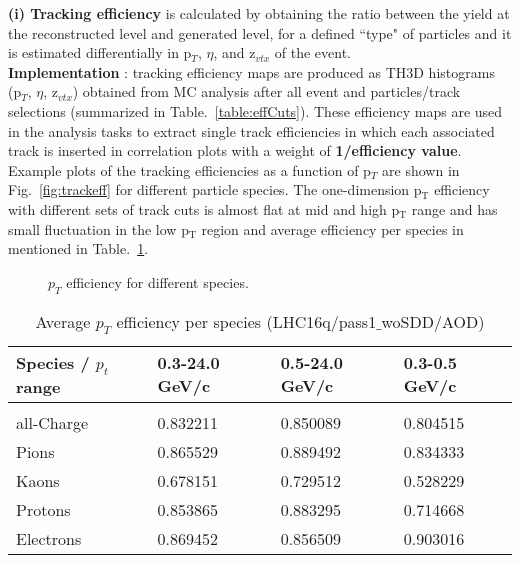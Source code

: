 
{\bf \normalsize (i) Tracking efficiency} is calculated by obtaining the ratio between the yield at the reconstructed level and generated level, for a defined ``type" of particles and it is estimated differentially in p$_T$, $\eta$, and z$_{vtx}$ of the event.\\
{\bf Implementation }: tracking efficiency maps are produced as TH3D histograms (p$_T$, $\eta$, z$_{vtx}$) obtained from MC analysis after all event and particles/track selections (summarized in Table.~\ref{table:effCuts}). These efficiency maps are used in the analysis tasks to extract single track efficiencies in which each associated track is inserted in correlation plots with a weight of {\bf 1/efficiency value}. Example plots of the tracking efficiencies as a function of p$_T$ are shown in Fig.~\ref{fig:trackeff} for different particle species. %
The one-dimension p$_\mathrm{T}$ efficiency with different sets of track cuts is almost flat at mid and high p$_\mathrm{T}$ range and has small fluctuation in the low p$_\mathrm{T}$ region and average efficiency per species in mentioned in Table.~\ref{table:AvgeffValue}.



\begin{figure}[h]
	\centering
	\caption{$p_T$ efficiency for different species.}
	\label{fig:trackeffvsspecies}	
\end{figure}


\begin{table}[h]
\small
\centering %
\begin{tabular}{ p{3.5cm} | p{2.5cm} | p{2.5cm} |  p{2.5cm}  }
{\normalsize \textbf {Species / $p_t$ range }} & {\normalsize \textbf {0.3-24.0 GeV/c}} &   {\normalsize \textbf {0.5-24.0 GeV/c}} &   {\normalsize \textbf {0.3-0.5 GeV/c}}\\
\hline
&&\\		
all-Charge & 0.832211 & 0.850089 & 0.804515 \\
Pions & 0.865529 & 0.889492 & 0.834333 \\
Kaons & 0.678151 & 0.729512 & 0.528229 \\
Protons & 0.853865 & 0.883295 & 0.714668 \\
Electrons & 0.869452 & 0.856509 & 0.903016 \\
 \hline \hline
\end{tabular}
\caption{\large {Average $p_T$ efficiency per species (LHC16q/pass1$\_$woSDD/AOD)}} %
\label{table:AvgeffValue}	
\end{table}

